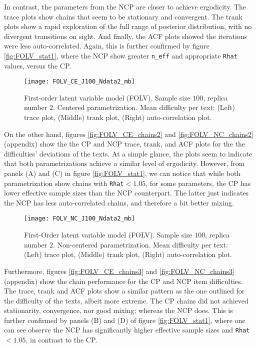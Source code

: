 In contrast, the parameters from the NCP are closer to achieve ergodicity. The trace plots show chains that seem to be stationary and convergent. The trank plots show a rapid exploration of the full range of posterior distribution, with no divergent transitions on sight. And finally, the ACF plots showed the iterations were less auto-correlated. Again, this is further confirmed by figure \ref{fig:FOLV_stat1}, where the NCP show greater \texttt{n\_eff} and appropriate \texttt{Rhat} values, versus the CP.
%
\begin{figure}[H]
	\centering
	\texttt{[image: FOLV\_CE\_J100\_Ndata2\_mb]}
	\caption[First-order latent variable model (FOLV). Sample size $100$, replica number $2$. Centered parametrization. Mean difficulty per text. Trace, trank and auto-correlation plots.]%
	{First-order latent variable model (FOLV). Sample size $100$, replica number $2$. Centered parametrization. Mean difficulty per text: (Left) trace plot, (Middle) trank plot, (Right) auto-correlation plot.}
	\label{fig:FOLV_CE_chains1}
\end{figure}

On the other hand, figures \ref{fig:FOLV_CE_chains2} and \ref{fig:FOLV_NC_chains2} (appendix) show the the CP and NCP trace, trank, and ACF plots for the the difficulties' deviations of the texts. At a simple glance, the plots seem to indicate that both parametrizations achieve a similar level of ergodicity. However, from panels (A) and (C) in figure \ref{fig:FOLV_stat1}, we can notice that while both parametrization show chains with \texttt{Rhat}$<1.05$, for some parameters, the CP has lower effective sample sizes than the NCP counterpart. The latter just indicates the NCP has less auto-correlated chains, and therefore a bit better mixing.
%
\begin{figure}[H]
	\centering
	\texttt{[image: FOLV\_NC\_J100\_Ndata2\_mb]}
	\caption[First-Order latent variable model (FOLV). Sample size $100$, replica number $2$. Non-centered parametrization. Mean difficulty per text. Trace, trank and auto-correlation plots.]%
	{First-Order latent variable model (FOLV). Sample size $100$, replica number $2$. Non-centered parametrization. Mean difficulty per text: (Left) trace plot, (Middle) trank plot, (Right) auto-correlation plot.}
	\label{fig:FOLV_NC_chains1}
\end{figure}

Furthermore, figures \ref{fig:FOLV_CE_chains3} and \ref{fig:FOLV_NC_chains3} (appendix) show the chain performance for the CP and NCP item difficulties. The trace, trank and ACF plots show a similar pattern as the one outlined for the difficulty of the texts, albeit more extreme. The CP chains did not achieved stationarity, convergence, nor good mixing; whereas the NCP does. This is further confirmed by panels (B) and (D) of figure \ref{fig:FOLV_stat1}, where one can see observe the NCP has significantly higher effective sample sizes and \texttt{Rhat}$<1.05$, in contrast to the CP.

